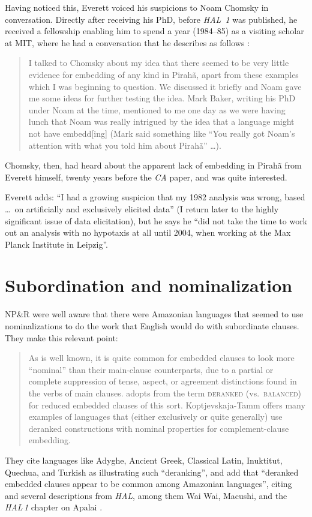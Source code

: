 \documentclass[output=paper,colorlinks,citecolor=brown
]{langscibook}
\begin{document}
Having noticed this, Everett voiced his suspicions to Noam Chomsky in
conversation. Directly after receiving his PhD, before \textit{HAL~1}
was published, he received a fellowship enabling him to spend a year
(1984--85) as a visiting scholar at MIT, where he had a conversation
that he describes as follows \citep[12, fn.\,7]{Everett07}:
\begin{quote}
I talked to Chomsky about my idea that there seemed to be very
little evidence for embedding of any kind in Pirahã, apart from
these \mbox{} examples which I was beginning to question.
We discussed it briefly and Noam gave me some ideas for further
testing the idea. Mark Baker, writing his PhD under Noam at
the time, mentioned to me one day as we were having lunch that Noam
was really intrigued by the idea that a language might not have
embedd[ing] (Mark said something like ``You really got Noam's
attention with what you told him about Pirah{\~a}'' \ldots).
\end{quote}
Chomsky, then, had heard about the apparent lack of embedding in
Pirah{\~a} from Everett himself, twenty years before the \textit{CA}
paper, and was quite interested.

Everett adds: ``I had a growing suspicion that my 1982 analysis was
wrong, based \ldots\ on artificially and exclusively elicited data''
(I return later to the highly significant issue of data elicitation),
but he says he ``did not take the time to work out an analysis with
no hypotaxis at all until 2004, when working at the Max Planck
Institute in Leipzig''.

\section{Subordination and nominalization}

NP\&R were well aware that there were Amazonian languages that seemed
to use nominalizations to do the work that English would do with
subordinate clauses. They make this relevant point:
\begin{quote}
As is well known, it is quite common for embedded clauses to look
more ``nominal'' than their main-clause counterparts, due to a partial
or complete suppression of tense, aspect, or agreement distinctions
found in the verbs of main clauses. \citet{koptjevskaja1993nominalizations} adopts
from \citet{stassen1985comparison} the term \textsc{deranked} (vs.\ \textsc{balanced})
for reduced embedded clauses of this sort. Koptjevskaja-Tamm offers
many examples of languages that (either exclusively or quite generally)
use deranked constructions with nominal properties for complement-clause
embedding.
\citep[370]{NevPesRod09a}
\end{quote}
They cite languages like Adyghe, Ancient Greek, Classical Latin, Inuktitut,
Quechua, and Turkish as illustrating such ``deranking'', and add that
``deranked embedded clauses appear to be common among Amazonian languages'',
citing \citet{Derbyshire87} and several descriptions from \textit{HAL},
among them Wai Wai, Macushi, and the \textit{HAL\,1} chapter on Apalai
\citep{Koehn86}.
\end{document}
